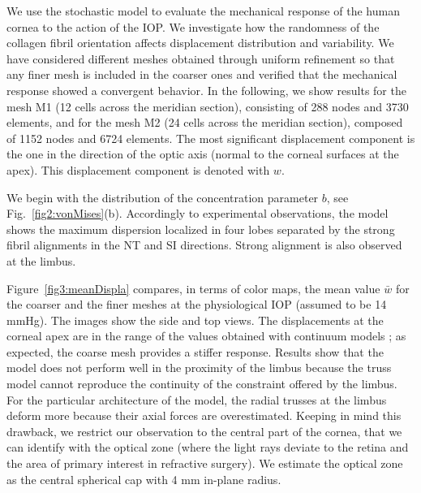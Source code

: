 \documentclass[preprint,12pt]{elsarticle}
\begin{document}
We use the stochastic model to evaluate the mechanical response of the human cornea to the action of the IOP. We investigate how the randomness of the collagen fibril orientation affects displacement distribution and variability. We have considered different meshes obtained through uniform refinement so that any finer mesh is included in the coarser ones and verified that the mechanical response showed a convergent behavior. In the following, we show results for the mesh M1 (12 cells across the meridian section), consisting of 288 nodes and 3730 elements, and for the mesh M2 (24 cells across the meridian section), composed of 1152 nodes and 6724 elements. The most significant displacement component is the one in the direction of the optic axis (normal to the corneal surfaces at the apex). This displacement component is denoted with $w$.  

We begin with the distribution of the concentration parameter $b$, see Fig.~\ref{fig2:vonMises}(b). Accordingly to experimental observations, the model shows the maximum dispersion localized in four lobes separated by the strong fibril alignments in the NT and SI directions. Strong alignment is also observed at the limbus.

Figure~\ref{fig3:meanDispla} compares, in terms of color maps, the mean value $\bar w$ for the coarser and the finer meshes at the physiological IOP (assumed to be 14 mmHg). The images show the side and top views. The displacements at the corneal apex are in the range of the values obtained with continuum models \cite{pandolfi:2006}; as expected, the coarse mesh provides a stiffer response. Results show that the model does not perform well in the proximity of the limbus because the truss model cannot reproduce the continuity of the constraint offered by the limbus. For the particular architecture of the model, the radial trusses at the limbus deform more because their axial forces are overestimated. Keeping in mind this drawback, we restrict our observation to the central part of the cornea, that we can identify with the optical zone (where the light rays deviate to the retina and the area of primary interest in refractive surgery). We estimate the optical zone as the central spherical cap with 4 mm in-plane radius.
\end{document}

